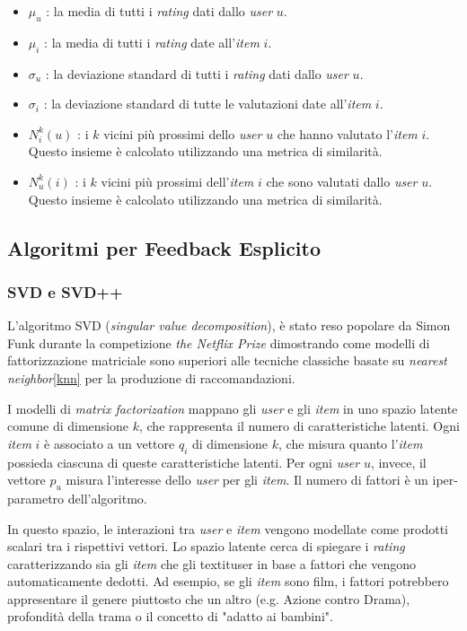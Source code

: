 \begin{itemize}
    \item $\mu_u$ : la media di tutti i \textit{rating} dati dallo \textit{user} $u$.
    \item $\mu_i$ : la media di tutti i \textit{rating} date all'\textit{item} $i$.
    \item $\sigma_u$ : la deviazione standard di tutti i \textit{rating} dati dallo \textit{user} $u$.
    \item $\sigma_i$ : la deviazione standard di tutte le valutazioni date all'\textit{item} $i$.
    \item $N_i^k(u)$ : i $k$ vicini più prossimi dello \textit{user} $u$ che hanno valutato l'\textit{item} $i$. Questo insieme è calcolato utilizzando una metrica di similarità.
    \item $N_u^k(i)$ : i $k$ vicini più prossimi dell'\textit{item} $i$ che sono valutati dallo \textit{user} $u$. Questo insieme è calcolato utilizzando una metrica di similarità.
\end{itemize}

\subsection{Algoritmi per Feedback Esplicito}\label{algoritmi-per-feedback-esplicito}

\subsubsection{SVD e SVD++}\label{matrix-factorization}

L'algoritmo SVD (\textit{singular value decomposition}), è stato reso popolare da Simon Funk durante la competizione \textit{the Netflix Prize} dimostrando come modelli di fattorizzazione matriciale sono superiori alle tecniche classiche basate su \textit{nearest neighbor}\ref{knn} per
la produzione di raccomandazioni.

I modelli di \textit{matrix factorization} mappano gli \textit{user} e gli \textit{item} in uno spazio latente comune di dimensione $k$, che rappresenta il numero di caratteristiche latenti. Ogni \textit{item} $i$ è associato a un vettore $q_i$ di dimensione $k$, che misura quanto l'\textit{item} possieda ciascuna di queste caratteristiche latenti. Per ogni \textit{user} $u$, invece, il vettore $p_u$ misura l'interesse dello \textit{user} per gli \textit{item}. Il numero di fattori è un iper-parametro dell'algoritmo.

In questo spazio, le interazioni tra \textit{user} e \textit{item} vengono modellate come prodotti scalari tra i rispettivi vettori. Lo spazio latente cerca di spiegare i \textit{rating} caratterizzando sia gli \textit{item} che gli textit{user} in base a fattori che vengono automaticamente dedotti. Ad esempio, se gli \textit{item} sono film, i fattori potrebbero appresentare il genere piuttosto che un altro (e.g. Azione contro Drama), profondità della trama o il concetto di "adatto ai bambini".


